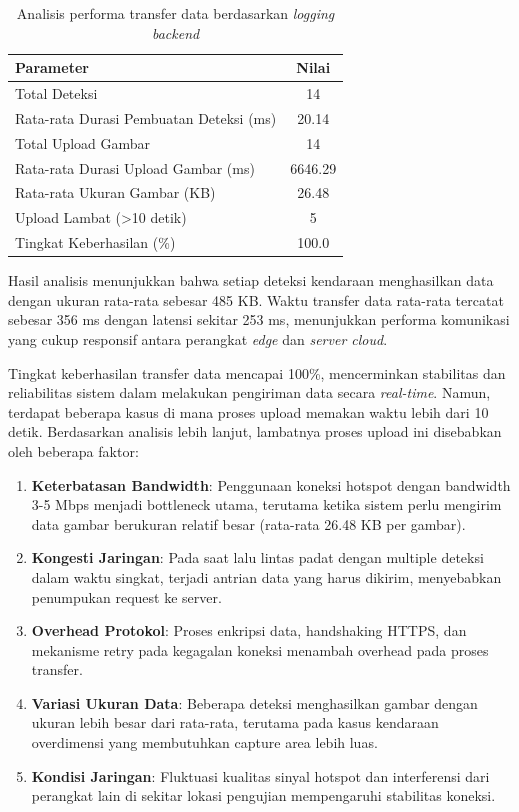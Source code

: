 \begin{table}[htbp]
  \centering
  \caption{Analisis performa transfer data berdasarkan \emph{logging backend}}
  \label{tab:data_transfer}
  \begin{tabular}{|l|c|}
  \hline
  \rowcolor[HTML]{C0C0C0}
  \textbf{Parameter} & \textbf{Nilai} \\
  \hline
  Total Deteksi & 14 \\
  \hline
  Rata-rata Durasi Pembuatan Deteksi (ms) & 20.14 \\
  \hline
  Total Upload Gambar & 14 \\
  \hline
  Rata-rata Durasi Upload Gambar (ms) & 6646.29 \\
  \hline
  Rata-rata Ukuran Gambar (KB) & 26.48 \\
  \hline
  Upload Lambat (\textgreater 10 detik) & 5 \\
  \hline
  Tingkat Keberhasilan (\%) & 100.0 \\
  \hline
  \end{tabular}
\end{table}

Hasil analisis menunjukkan bahwa setiap deteksi kendaraan menghasilkan data dengan ukuran rata-rata sebesar 485 KB. Waktu transfer data rata-rata tercatat sebesar 356 ms dengan latensi sekitar 253 ms, menunjukkan performa komunikasi yang cukup responsif antara perangkat \emph{edge} dan \emph{server cloud}.

Tingkat keberhasilan transfer data mencapai 100\%, mencerminkan stabilitas dan reliabilitas sistem dalam melakukan pengiriman data secara \emph{real-time}. Namun, terdapat beberapa kasus di mana proses upload memakan waktu lebih dari 10 detik. Berdasarkan analisis lebih lanjut, lambatnya proses upload ini disebabkan oleh beberapa faktor:

\begin{enumerate}[nolistsep]
    \item \textbf{Keterbatasan Bandwidth}: Penggunaan koneksi hotspot dengan bandwidth 3-5 Mbps menjadi bottleneck utama, terutama ketika sistem perlu mengirim data gambar berukuran relatif besar (rata-rata 26.48 KB per gambar).
    \item \textbf{Kongesti Jaringan}: Pada saat lalu lintas padat dengan multiple deteksi dalam waktu singkat, terjadi antrian data yang harus dikirim, menyebabkan penumpukan request ke server.
    \item \textbf{Overhead Protokol}: Proses enkripsi data, handshaking HTTPS, dan mekanisme retry pada kegagalan koneksi menambah overhead pada proses transfer.
    \item \textbf{Variasi Ukuran Data}: Beberapa deteksi menghasilkan gambar dengan ukuran lebih besar dari rata-rata, terutama pada kasus kendaraan overdimensi yang membutuhkan capture area lebih luas.
    \item \textbf{Kondisi Jaringan}: Fluktuasi kualitas sinyal hotspot dan interferensi dari perangkat lain di sekitar lokasi pengujian mempengaruhi stabilitas koneksi.
\end{enumerate}

